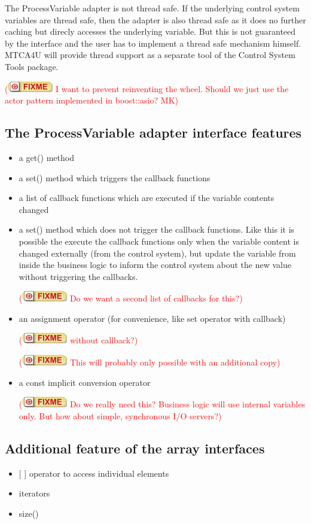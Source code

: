 \documentclass[11pt,a4paper]{scrartcl}
\newcounter{nFixmes}
\newcommand{\fixme}[1]{\addtocounter{nFixmes}{1}\textcolor{red}{(\includegraphics[height=2ex]{fixme} #1)}\xspace}
\begin{document}
The ProcessVariable adapter is not thread safe. If the underlying control system variables are thread safe, then the adapter is also thread safe as it does no further caching but direcly accesses the underlying variable. But this is not guaranteed by the interface and the user has to implement a thread safe mechanism himself. MTCA4U will provide thread support as a separate tool of the Control System Tools package. \fixme{I want to prevent reinventing the wheel. Should we just use the actor pattern implemented in boost::asio? MK}


\subsection{The ProcessVariable adapter interface features}
\begin{itemize}
\item a get() method
\item a set() method which triggers the callback functions
\item a list of callback functions which are executed if the variable contents changed
\item a set() method which does not trigger the callback functions. Like this it is possible the execute the callback functions only when the variable content is changed externally (from the control system), but update the variable from inside the business logic to inform the control system about the new value without triggering the callbacks.
  \fixme{Do we want a second list of callbacks for this?}
\item an assignment operator (for convenience, like set operator with callback) \fixme{without callback?} \fixme{This will probably only possible with an additional copy}
\item a const implicit conversion operator \fixme{Do we really need this? Business logic will use internal variables only. But how about simple, synchronous I/O servers?}
\end{itemize}

\subsection{Additional feature of the array interfaces}

\begin{itemize}
\item {[ ]} operator to access individual elements
\item iterators
\item size()
\end{itemize}
\end{document}
